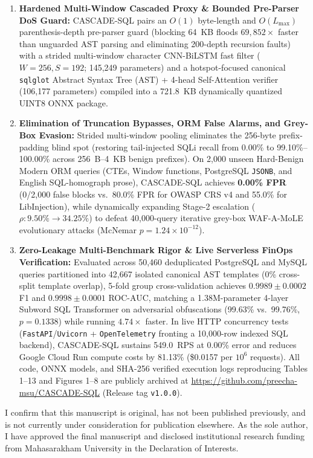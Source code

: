 \documentclass[11pt,a4paper]{article}
\begin{document}
\begin{enumerate}
  \item \textbf{Hardened Multi-Window Cascaded Proxy \& Bounded Pre-Parser DoS Guard:} CASCADE-SQL pairs an $O(1)$ byte-length and $O(L_{\max})$ parenthesis-depth pre-parser guard (blocking 64~KB floods $69,852\times$ faster than unguarded AST parsing and eliminating 200-depth recursion faults) with a strided multi-window character CNN-BiLSTM fast filter ($W=256, S=192$; 145,249 parameters) and a hotspot-focused canonical \texttt{sqlglot} Abstract Syntax Tree (AST) + 4-head Self-Attention verifier (106,177 parameters) compiled into a 721.8~KB dynamically quantized UINT8 ONNX package.
  \item \textbf{Elimination of Truncation Bypasses, ORM False Alarms, and Grey-Box Evasion:} Strided multi-window pooling eliminates the 256-byte prefix-padding blind spot (restoring tail-injected SQLi recall from 0.00\% to 99.10\%--100.00\% across 256~B--4~KB benign prefixes). On 2,000 unseen Hard-Benign Modern ORM queries (CTEs, Window functions, PostgreSQL \texttt{JSONB}, and English SQL-homograph prose), CASCADE-SQL achieves \textbf{0.00\% FPR} (0/2,000 false blocks vs.\ 80.0\% FPR for OWASP CRS v4 and 55.0\% for LibInjection), while dynamically expanding Stage-2 escalation ($\rho: 9.50\% \rightarrow 34.25\%$) to defeat 40,000-query iterative grey-box WAF-A-MoLE evolutionary attacks (McNemar $p = 1.24 \times 10^{-12}$).
  \item \textbf{Zero-Leakage Multi-Benchmark Rigor \& Live Serverless FinOps Verification:} Evaluated across 50,460 deduplicated PostgreSQL and MySQL queries partitioned into 42,667 isolated canonical AST templates (0\% cross-split template overlap), 5-fold group cross-validation achieves $0.9989 \pm 0.0002$ F1 and $0.9998 \pm 0.0001$ ROC-AUC, matching a 1.38M-parameter 4-layer Subword SQL Transformer on adversarial obfuscations (99.63\% vs.\ 99.76\%, $p=0.1338$) while running $4.74\times$ faster. In live HTTP concurrency tests (\texttt{FastAPI}/\texttt{Uvicorn} + \texttt{OpenTelemetry} fronting a 10,000-row indexed SQL backend), CASCADE-SQL sustains 549.0~RPS at 0.00\% error and reduces Google Cloud Run compute costs by 81.13\% (\$0.0157 per $10^6$ requests). All code, ONNX models, and SHA-256 verified execution logs reproducing Tables 1--13 and Figures 1--8 are publicly archived at \url{https://github.com/preecha-msu/CASCADE-SQL} (Release tag \texttt{v1.0.0}).
\end{enumerate}

I confirm that this manuscript is original, has not been published previously, and is not currently under consideration for publication elsewhere. As the sole author, I have approved the final manuscript and disclosed institutional research funding from Mahasarakham University in the Declaration of Interests.
\end{document}
